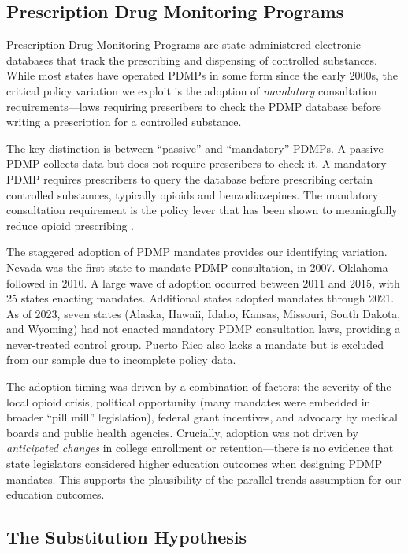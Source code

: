 \documentclass[12pt]{article}
\begin{document}
\subsection{Prescription Drug Monitoring Programs}

Prescription Drug Monitoring Programs are state-administered electronic databases that track the prescribing and dispensing of controlled substances. While most states have operated PDMPs in some form since the early 2000s, the critical policy variation we exploit is the adoption of \textit{mandatory} consultation requirements---laws requiring prescribers to check the PDMP database before writing a prescription for a controlled substance.

The key distinction is between ``passive'' and ``mandatory'' PDMPs. A passive PDMP collects data but does not require prescribers to check it. A mandatory PDMP requires prescribers to query the database before prescribing certain controlled substances, typically opioids and benzodiazepines. The mandatory consultation requirement is the policy lever that has been shown to meaningfully reduce opioid prescribing \citep{buchmueller2018effect}.

The staggered adoption of PDMP mandates provides our identifying variation. Nevada was the first state to mandate PDMP consultation, in 2007. Oklahoma followed in 2010. A large wave of adoption occurred between 2011 and 2015, with 25 states enacting mandates. Additional states adopted mandates through 2021. As of 2023, seven states (Alaska, Hawaii, Idaho, Kansas, Missouri, South Dakota, and Wyoming) had not enacted mandatory PDMP consultation laws, providing a never-treated control group. Puerto Rico also lacks a mandate but is excluded from our sample due to incomplete policy data.

The adoption timing was driven by a combination of factors: the severity of the local opioid crisis, political opportunity (many mandates were embedded in broader ``pill mill'' legislation), federal grant incentives, and advocacy by medical boards and public health agencies. Crucially, adoption was not driven by \textit{anticipated changes} in college enrollment or retention---there is no evidence that state legislators considered higher education outcomes when designing PDMP mandates. This supports the plausibility of the parallel trends assumption for our education outcomes.

\subsection{The Substitution Hypothesis}
\end{document}
